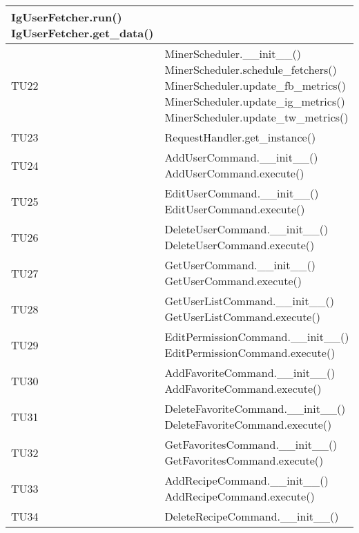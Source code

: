 \begin{center}
\begin{longtable}{| p{3cm} | p{9.5cm} |}
					IgUserFetcher.run() \newline
					IgUserFetcher.get\_data() \\
					\hline
					TU22 & MinerScheduler.\_\_init\_\_() \newline
					MinerScheduler.schedule\_fetchers() \newline
					MinerScheduler.update\_fb\_metrics() \newline
					MinerScheduler.update\_ig\_metrics() \newline
					MinerScheduler.update\_tw\_metrics() \\
					\hline
					TU23 & RequestHandler.get\_instance() \\
					\hline
					TU24 & AddUserCommand.\_\_init\_\_() \newline
					AddUserCommand.execute() \\
					\hline
					TU25 & EditUserCommand.\_\_init\_\_() \newline
					EditUserCommand.execute() \\
					\hline
					TU26 & DeleteUserCommand.\_\_init\_\_() \newline
					DeleteUserCommand.execute() \\
					\hline
					TU27 & GetUserCommand.\_\_init\_\_() \newline
					GetUserCommand.execute() \\
					\hline
					TU28 & GetUserListCommand.\_\_init\_\_() \newline
					GetUserListCommand.execute() \\
					\hline
					TU29 & EditPermissionCommand.\_\_init\_\_() \newline
					EditPermissionCommand.execute() \\
					\hline
					TU30 & AddFavoriteCommand.\_\_init\_\_() \newline
					AddFavoriteCommand.execute() \\
					\hline
					TU31 & DeleteFavoriteCommand.\_\_init\_\_() \newline
					DeleteFavoriteCommand.execute() \\
					\hline
					TU32 & GetFavoritesCommand.\_\_init\_\_() \newline
					GetFavoritesCommand.execute() \\
					\hline
					TU33 & AddRecipeCommand.\_\_init\_\_() \newline
					AddRecipeCommand.execute() \\
					\hline
					TU34 & DeleteRecipeCommand.\_\_init\_\_() \newline

\end{longtable}
\end{center}
